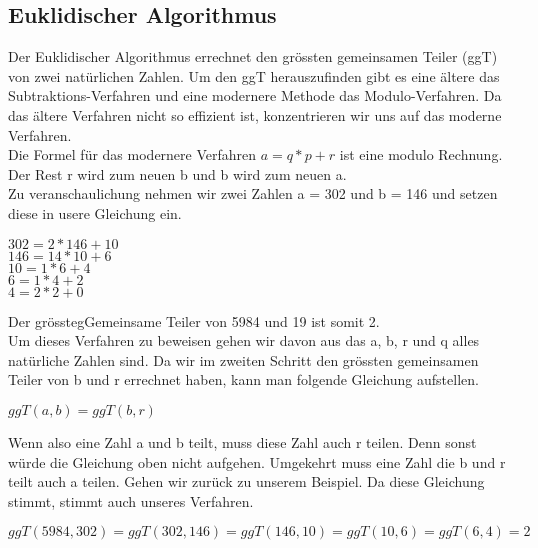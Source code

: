 \subsection{Euklidischer Algorithmus}
Der Euklidischer Algorithmus errechnet den grössten gemeinsamen Teiler (ggT) von zwei natürlichen Zahlen. Um den ggT herauszufinden gibt es eine ältere das Subtraktions-Verfahren und eine modernere Methode das Modulo-Verfahren. Da das ältere Verfahren nicht so effizient ist, konzentrieren wir uns auf das moderne Verfahren.\\
Die Formel für das modernere Verfahren $a = q * p + r$ ist eine modulo Rechnung. Der Rest r wird zum neuen b und b wird zum neuen a. \\
Zu veranschaulichung nehmen wir zwei Zahlen a = 302 und b = 146 und setzen diese in usere Gleichung ein.
\begin{center}
$ 302 = 2 * 146 + 10 $\\
$ 146 = 14 * 10 + 6 $ \\
$ 10 = 1 * 6 + 4 $ \\
$ 6 = 1 * 4 + 2 $ \\
$ 4 = 2 * 2 + 0 $\\
\end{center}
Der grösstegGemeinsame Teiler von 5984 und 19 ist somit 2. \\[2ex]
Um dieses Verfahren zu beweisen gehen wir davon aus das a, b, r und q alles natürliche Zahlen sind. Da wir im zweiten Schritt den grössten gemeinsamen Teiler von b und r errechnet haben, kann man folgende Gleichung aufstellen.
\begin{center}
$ ggT(a,b) = ggT(b,r) $\\
\end{center}
Wenn also eine Zahl a und b teilt, muss diese Zahl auch r teilen. Denn sonst würde die Gleichung oben nicht aufgehen. Umgekehrt muss eine Zahl die b und r teilt auch a teilen. Gehen wir zurück zu unserem Beispiel. Da diese Gleichung stimmt, stimmt auch unseres Verfahren.
\begin{center}
$ ggT(5984,302) = ggT(302,146) = ggT(146,10) = ggT(10,6) = ggT(6,4) = 2 $
\end{center}
